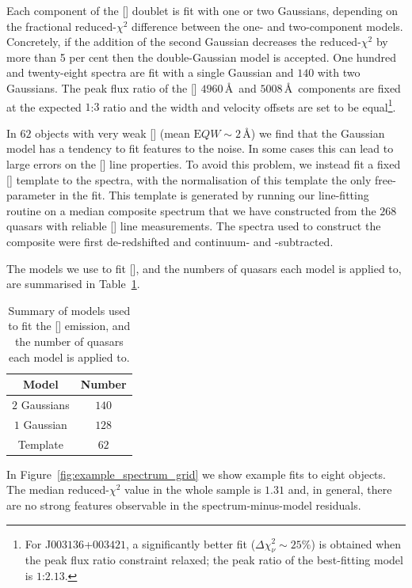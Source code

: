 Each component of the [] doublet is fit with one or two Gaussians, depending on the fractional reduced-$\chi^2$ difference between the one- and two-component models. 
Concretely, if the addition of the second Gaussian decreases the reduced-$\chi^2$ by more than 5 per cent then the double-Gaussian model is accepted.
One hundred and twenty-eight spectra are fit with a single Gaussian and $140$ with two Gaussians. 
The peak flux ratio of the [] $4960$\,\AA\, and $5008$\,\AA\, components are fixed at the expected $1$:$3$ ratio and the width and velocity offsets are set to be equal\footnote{For J$003136$+$003421$, a significantly better fit ($\Delta \chi^2_{\nu} \sim 25\%$) is obtained when the peak flux ratio constraint relaxed; the peak ratio of the best-fitting model is $1$:$2.13$.}.

In $62$ objects with very weak [] (mean ${\mathrm EQW}\sim2$\,\AA) we find that the Gaussian model has a tendency to fit features to the noise. 
In some cases this can lead to large errors on the [] line properties. 
To avoid this problem, we instead fit a fixed [] template to the spectra, with the normalisation of this template the only free-parameter in the fit.
This template is generated by running our line-fitting routine on a median composite spectrum that we have constructed from the $268$ quasars with reliable [] line measurements.  
The spectra used to construct the composite were first de-redshifted and continuum- and -subtracted.  

The models we use to fit [], and the numbers of quasars each model is applied to, are summarised in Table~\ref{tab:oiiimod}.

\begin{table}
  \centering
  \footnotesize 
  \caption{Summary of models used to fit the [] emission, and the number of quasars each model is applied to.}
  \label{tab:oiiimod}
    \begin{tabular}{cc} 
    \hline
    Model & Number \\
    \hline
    $2$ Gaussians &  $140$ \\
    $1$ Gaussian  &  $128$ \\
    Template &  $62$ \\
    \hline
    \end{tabular}
\end{table} 

In Figure~\ref{fig:example_spectrum_grid} we show example fits to eight objects. 
The median reduced-$\chi^2$ value in the whole sample is $1.31$ and, in general, there are no strong features observable in the spectrum-minus-model residuals.

